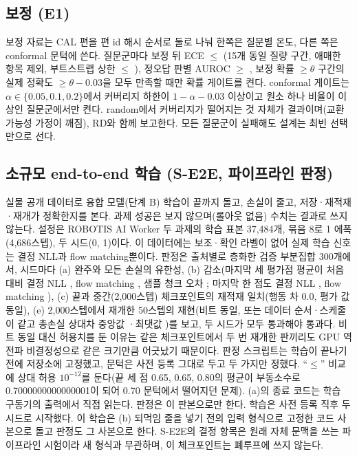 \subsection{보정 (E1)}
\label{sec:plan_e1}
보정 자료는 CAL 편을 편 id 해시 순서로 둘로 나눠 한쪽은 질문별 온도, 다른 쪽은 conformal 문턱에 쓴다. 질문군마다 보정 뒤 ECE $\le$ (15개 동일 질량 구간, 애매한 항목 제외, 부트스트랩 상한 $\le$ ), 정오답 판별 AUROC $\ge$ , 보정 확률 $\ge\theta$ 구간의 실제 정확도 $\ge\theta-0.03$을 모두 만족할 때만 확률 게이트를 켠다. conformal 게이트는 $\alpha\in\{0.05,0.1,0.2\}$에서 커버리지 하한이 $1-\alpha-0.03$ 이상이고 원소 하나 비율이  이상인 질문군에서만 켠다. random에서 커버리지가 떨어지는 것 자체가 결과이며(교환 가능성 가정이 깨짐), RD와 함께 보고한다. 모든 질문군이 실패해도 설계는 최빈 선택만으로 선다.

\subsection{소규모 end-to-end 학습 (S-E2E, 파이프라인 판정)}
\label{sec:plan_se2e}
실물 공개 데이터로 융합 모델(단계 B) 학습이 끝까지 돌고, 손실이 줄고, 저장·재적재·재개가 정확한지를 본다. 과제 성공은 보지 않으며(롤아웃 없음) 수치는 결과로 쓰지 않는다. 설정은 ROBOTIS AI Worker 두 과제의 학습 표본 37,484개, 묶음 8로 1 에폭(4,686스텝), 두 시드(0, 1)이다. 이 데이터에는 보조·확인 라벨이 없어 실제 학습 신호는 결정 NLL과 flow matching뿐이다. 판정은 출처별로 층화한 검증 부분집합 300개에서, 시드마다 (a) 완주와 모든 손실의 유한성, (b) 감소(마지막 세 평가점 평균이 처음 대비 결정 NLL \tentative{$\le 0.70\times$}, flow matching \tentative{$\le 0.80\times$}, 샘플 청크 오차 \tentative{$\le 0.80\times$}; 마지막 한 점도 결정 NLL \tentative{$\le 0.80\times$}, flow matching \tentative{$\le 0.90\times$}), (c) 끝과 중간(2,000스텝) 체크포인트의 재적재 일치(행동 차 0.0, 평가 값 동일), (e) 2,000스텝에서 재개한 50스텝의 재현(비트 동일, 또는 데이터 순서·스케줄이 같고 총손실 상대차 중앙값 ·최댓값 )를 보고, 두 시드가 모두 통과해야 통과다. 비트 동일 대신 허용치를 둔 이유는 같은 체크포인트에서 두 번 재개한 판끼리도 GPU 역전파 비결정성으로 같은 크기만큼 어긋났기 때문이다. 판정 스크립트는 학습이 끝나기 전에 저장소에 고정했고, 문턱은 사전 등록 그대로 두고 두 가지만 정했다. ``$\le$'' 비교에 상대 허용 $10^{-12}$를 둔다(끝 세 점 0.65, 0.65, 0.80의 평균이 부동소수로 0.7000000000000001이 되어 0.70 문턱에서 떨어지던 문제). (a)의 종료 코드는 학습 구동기의 출력에서 직접 읽는다. 판정은 이 판본으로만 한다. 학습은 사전 등록 직후 두 시드로 시작했다. 이 학습은 (b) 되먹임 줄을 넣기 전의 입력 형식으로 고정한 코드 사본으로 돌고 판정도 그 사본으로 한다. S-E2E의 결정 항목은 원래 자체 문맥을 쓰는 파이프라인 시험이라 새 형식과 무관하며, 이 체크포인트는 폐루프에 쓰지 않는다.

